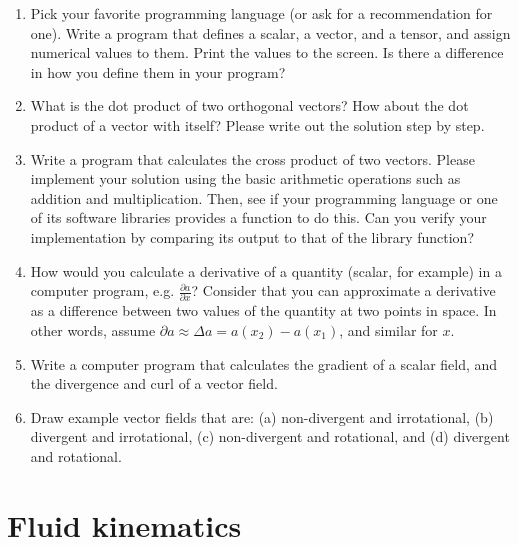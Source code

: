 \documentclass[12pt]{article}
\numberwithin{equation}{section}
\numberwithin{figure}{section}
\numberwithin{table}{section}
\begin{document}
\begin{enumerate}
  
  \item Pick your favorite programming language (or ask for a recommendation for one).
  Write a program that defines a scalar, a vector, and a tensor, and assign
  numerical values to them.
  Print the values to the screen.
  Is there a difference in how you define them in your program?

  \item What is the dot product of two orthogonal vectors?
  How about the dot product of a vector with itself?
  Please write out the solution step by step.

  \item Write a program that calculates the cross product of two vectors.
  Please implement your solution using the basic arithmetic operations such as
  addition and multiplication.
  Then, see if your programming language or one of its software libraries
  provides a function to do this.
  Can you verify your implementation by comparing its output to that of the
  library function?

  \item How would you calculate a derivative of a quantity
  (scalar, for example) in a computer program, e.g. $\frac{\partial a}{\partial x}$?
  Consider that you can approximate a derivative as a difference between two
  values of the quantity at two points in space.
  In other words, assume $\partial a \approx \Delta a = a(x_2) - a(x_1)$,
  and similar for $x$.

  \item Write a computer program that calculates the gradient of a scalar field,
  and the divergence and curl of a vector field.
  
  \item Draw example vector fields that are: (a) non-divergent and irrotational,
  (b) divergent and irrotational, (c) non-divergent and rotational, and (d)
  divergent and rotational.
\end{enumerate}

\newpage
\section{Fluid kinematics}
\end{document}
